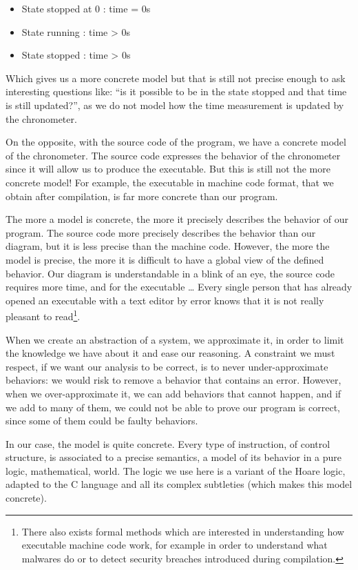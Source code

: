 \documentclass[12pt,francais,]{scrbook}
\providecommand{\tightlist}{%
  \setlength{\itemsep}{0pt}\setlength{\parskip}{0pt}}
\begin{document}
\begin{itemize}
\tightlist
\item
  State stopped at 0 : time = 0s
\item
  State running : time \textgreater{} 0s
\item
  State stopped : time \textgreater{} 0s
\end{itemize}

Which gives us a more concrete model but that is still not precise
enough to ask interesting questions like: ``is it possible to be in the
state stopped and that time is still updated?'', as we do not model how
the time measurement is updated by the chronometer.

On the opposite, with the source code of the program, we have a concrete
model of the chronometer. The source code expresses the behavior of the
chronometer since it will allow us to produce the executable. But this
is still not the more concrete model! For example, the executable in
machine code format, that we obtain after compilation, is far more
concrete than our program.

The more a model is concrete, the more it precisely describes the
behavior of our program. The source code more precisely describes the
behavior than our diagram, but it is less precise than the machine code.
However, the more the model is precise, the more it is difficult to have
a global view of the defined behavior. Our diagram is understandable in
a blink of an eye, the source code requires more time, and for the
executable \ldots{} Every single person that has already opened an
executable with a text editor by error knows that it is not really
pleasant to read\footnote{There also exists formal methods which are
  interested in understanding how executable machine code work, for
  example in order to understand what malwares do or to detect security
  breaches introduced during compilation.}.

When we create an abstraction of a system, we approximate it, in order
to limit the knowledge we have about it and ease our reasoning. A
constraint we must respect, if we want our analysis to be correct, is to
never under-approximate behaviors: we would risk to remove a behavior
that contains an error. However, when we over-approximate it, we can add
behaviors that cannot happen, and if we add to many of them, we could
not be able to prove our program is correct, since some of them could be
faulty behaviors.

In our case, the model is quite concrete. Every type of instruction, of
control structure, is associated to a precise semantics, a model of its
behavior in a pure logic, mathematical, world. The logic we use here is
a variant of the Hoare logic, adapted to the C language and all its
complex subtleties (which makes this model concrete).
\end{document}
